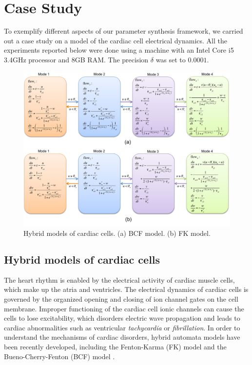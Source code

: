 \section{Case Study}

To exemplify different aspects of our parameter synthesis framework, we carried out a case study on
a model of the cardiac cell electrical dynamics. All the experiments reported below were done
using a machine with an Intel Core i5 3.4GHz processor and 8GB RAM. The precision $\delta$
was set to $0.0001$.

\begin{figure}[t]
\centering
\includegraphics[scale=0.5]{fig-cardiac-new}
\caption{Hybrid models of cardiac cells. (a) BCF model. (b) FK model.}
\label{model}
\end{figure}

\subsection{Hybrid models of cardiac cells}
The heart rhythm is enabled by the electrical activity of cardiac muscle cells, which make up the atria and ventricles. The electrical dynamics of cardiac cells is governed by the organized opening and closing of ion channel gates on the cell membrane. Improper functioning of the cardiac cell ionic channels can cause the cells to lose excitability, which disorders electric wave propagation and leads to cardiac abnormalities such as ventricular \textit{tachycardia} or \textit{fibrillation}. In order to understand the mechanisms of cardiac disorders,
hybrid automata models have been recently developed, including the Fenton-Karma (FK) model \cite{fenton98} and the Bueno-Cherry-Fenton (BCF) model \cite{orovio08}.

